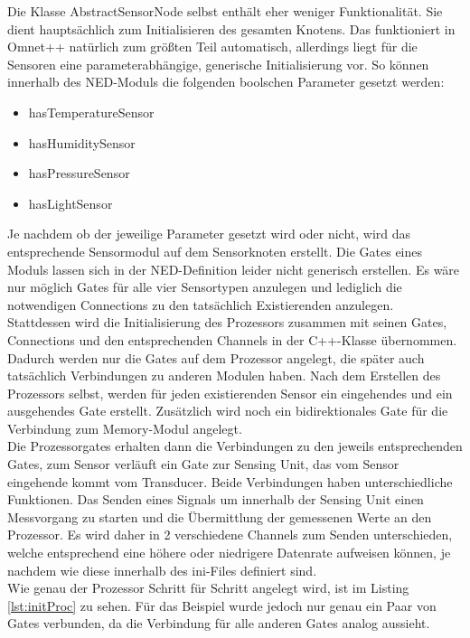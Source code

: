 Die Klasse AbstractSensorNode selbst enthält eher weniger Funktionalität. Sie dient hauptsächlich zum Initialisieren des gesamten Knotens. Das funktioniert in Omnet++ natürlich zum größten Teil automatisch, allerdings liegt für die Sensoren eine parameterabhängige, generische Initialisierung vor. So können innerhalb des NED-Moduls die folgenden boolschen Parameter gesetzt werden:
\begin{itemize}
\item hasTemperatureSensor
\item hasHumiditySensor
\item hasPressureSensor
\item hasLightSensor
\end{itemize}
Je nachdem ob der jeweilige Parameter gesetzt wird oder nicht, wird das entsprechende Sensormodul auf dem Sensorknoten erstellt. Die Gates eines Moduls lassen sich in der NED-Definition leider nicht generisch erstellen. Es wäre nur möglich Gates für alle vier Sensortypen anzulegen und lediglich die notwendigen Connections zu den tatsächlich Existierenden anzulegen.\\
Stattdessen wird die Initialisierung des Prozessors zusammen mit seinen Gates, Connections und den entsprechenden Channels in der C++-Klasse übernommen. Dadurch werden nur die Gates auf dem Prozessor angelegt, die später auch tatsächlich Verbindungen zu anderen Modulen haben. Nach dem Erstellen des Prozessors selbst, werden für jeden existierenden Sensor ein eingehendes und ein ausgehendes Gate erstellt. Zusätzlich wird noch ein bidirektionales Gate für die Verbindung zum Memory-Modul angelegt.\\
Die Prozessorgates erhalten dann die Verbindungen zu den jeweils entsprechenden Gates, zum Sensor verläuft ein Gate zur Sensing Unit, das vom Sensor eingehende kommt vom Transducer. Beide Verbindungen haben unterschiedliche Funktionen. Das Senden eines Signals um innerhalb der Sensing Unit einen Messvorgang zu starten und die Übermittlung der gemessenen Werte an den Prozessor. Es wird daher in 2 verschiedene Channels zum Senden unterschieden, welche entsprechend eine höhere oder niedrigere Datenrate aufweisen können, je nachdem wie diese innerhalb des ini-Files definiert sind.\\
Wie genau der Prozessor Schritt für Schritt angelegt wird, ist im Listing \ref{lst:initProc} zu sehen. Für das Beispiel wurde jedoch nur genau ein Paar von Gates verbunden, da die Verbindung für alle anderen Gates analog aussieht.
\newpage
